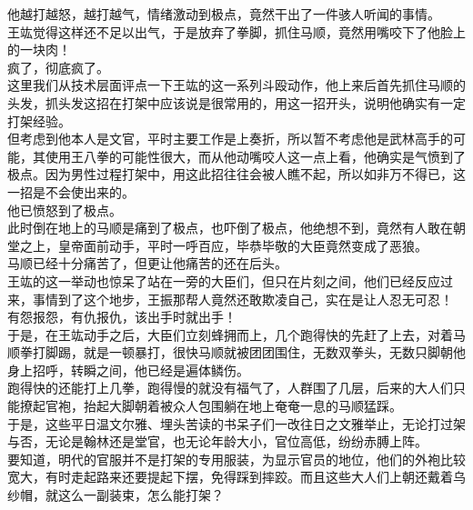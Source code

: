 \begin{multicols}{\theparacolNo}
他越打越怒，越打越气，情绪激动到极点，竟然干出了一件骇人听闻的事情。\\

王竑觉得这样还不足以出气，于是放弃了拳脚，抓住马顺，竟然用嘴咬下了他脸上的一块肉！\\

疯了，彻底疯了。\\

这里我们从技术层面评点一下王竑的这一系列斗殴动作，他上来后首先抓住马顺的头发，抓头发这招在打架中应该说是很常用的，用这一招开头，说明他确实有一定打架经验。\\

但考虑到他本人是文官，平时主要工作是上奏折，所以暂不考虑他是武林高手的可能，其使用王八拳的可能性很大，而从他动嘴咬人这一点上看，他确实是气愤到了极点。因为男性过程打架中，用这此招往往会被人瞧不起，所以如非万不得已，这一招是不会使出来的。\\

他已愤怒到了极点。\\

此时倒在地上的马顺是痛到了极点，也吓倒了极点，他绝想不到，竟然有人敢在朝堂之上，皇帝面前动手，平时一呼百应，毕恭毕敬的大臣竟然变成了恶狼。\\

马顺已经十分痛苦了，但更让他痛苦的还在后头。\\

王竑的这一举动也惊呆了站在一旁的大臣们，但只在片刻之间，他们已经反应过来，事情到了这个地步，王振那帮人竟然还敢欺凌自己，实在是让人忍无可忍！\\

有怨报怨，有仇报仇，该出手时就出手！\\

于是，在王竑动手之后，大臣们立刻蜂拥而上，几个跑得快的先赶了上去，对着马顺拳打脚踢，就是一顿暴打，很快马顺就被团团围住，无数双拳头，无数只脚朝他身上招呼，转瞬之间，他已经是遍体鳞伤。\\

跑得快的还能打上几拳，跑得慢的就没有福气了，人群围了几层，后来的大人们只能撩起官袍，抬起大脚朝着被众人包围躺在地上奄奄一息的马顺猛踩。\\

于是，这些平日温文尔雅、埋头苦读的书呆子们一改往日之文雅举止，无论打过架与否，无论是翰林还是堂官，也无论年龄大小，官位高低，纷纷赤膊上阵。\\

要知道，明代的官服并不是打架的专用服装，为显示官员的地位，他们的外袍比较宽大，有时走起路来还要提起下摆，免得踩到摔跤。而且这些大人们上朝还戴着乌纱帽，就这么一副装束，怎么能打架？\\


\end{multicols}
